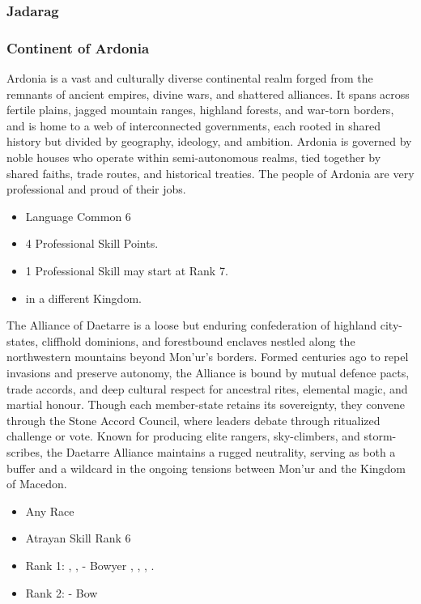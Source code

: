 \documentclass[12pt]{article}
\begin{document}
\subsubsection{Jadarag}
\subsubsection{Continent of Ardonia}
Ardonia is a vast and culturally diverse continental realm forged from the remnants of ancient empires, divine wars, and shattered alliances. It spans across fertile plains, jagged mountain ranges, highland forests, and war-torn borders, and is home to a web of interconnected governments, each rooted in shared history but divided by geography, ideology, and ambition.
Ardonia is governed by noble houses who operate within semi-autonomous realms, tied together by shared faiths, trade routes, and historical treaties. The people of Ardonia are very professional and proud of their jobs.
\begin{itemize}
\item Language Common 6
\item 4 Professional Skill Points.
\item 1 Professional Skill may start at Rank 7.
\item {} in a different Kingdom.
\end{itemize}
The Alliance of Daetarre is a loose but enduring confederation of highland city-states, cliffhold dominions, and forestbound enclaves nestled along the northwestern mountains beyond Mon'ur's borders. Formed centuries ago to repel invasions and preserve autonomy, the Alliance is bound by mutual defence pacts, trade accords, and deep cultural respect for ancestral rites, elemental magic, and martial honour. Though each member-state retains its sovereignty, they convene through the Stone Accord Council, where leaders debate through ritualized challenge or vote. Known for producing elite rangers, sky-climbers, and storm-scribes, the Daetarre Alliance maintains a rugged neutrality, serving as both a buffer and a wildcard in the ongoing tensions between Mon'ur and the Kingdom of Macedon.
\begin{itemize}
\item Any Race
\item Atrayan Skill Rank 6
\item Rank 1: , ,  - Bowyer , , , .
\item Rank 2:  - Bow
\end{itemize}
\end{document}
